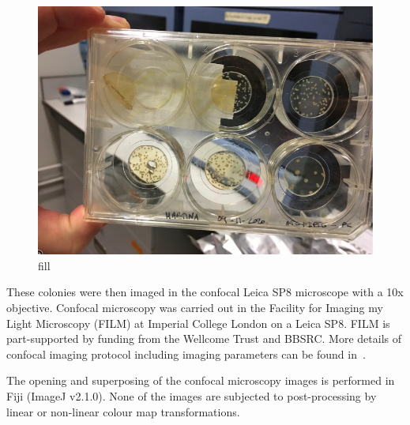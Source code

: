 \begin{figure}[H]

    \includegraphics[width=1\textwidth]{chapters/Methods/matek}
    \caption{fill}
    \label{matek}
\end{figure}

These colonies were then imaged in the confocal Leica SP8 microscope with a 10x objective.
Confocal microscopy was carried out in the Facility for Imaging my Light Microscopy (FILM) at Imperial College London on a Leica SP8.
FILM is part-supported by funding from the Wellcome Trust and BBSRC.
More details of confocal imaging protocol including imaging parameters can be found in~\parencite{Tica2020}.

The opening and superposing of the confocal microscopy images is performed in Fiji (ImageJ v2.1.0).
None of the images are subjected to post-processing by linear or non-linear colour map transformations.